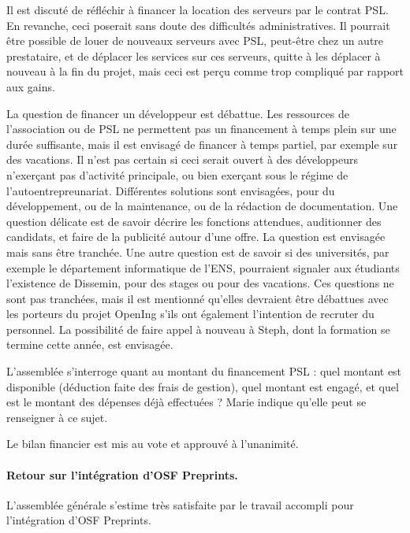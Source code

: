 \documentclass{scrartcl}
\begin{document}
Il est discuté de réfléchir à financer la location des serveurs par le contrat PSL. En revanche, ceci
poserait sans doute des difficultés administratives. Il pourrait être possible de louer de nouveaux serveurs
avec PSL, peut-être chez un autre prestataire, et de déplacer les services sur ces serveurs, quitte à
les déplacer à nouveau à la fin du projet, mais ceci est perçu comme trop compliqué par rapport aux gains.

La question de financer un développeur est débattue. Les ressources de l'association ou de PSL ne
permettent pas un financement à temps plein sur une durée suffisante, mais il est envisagé de financer
à temps partiel, par exemple sur des vacations. Il n'est pas certain si ceci serait ouvert à des développeurs
n'exerçant pas d'activité principale, ou bien exerçant sous le régime de l'autoentrepreunariat. Différentes
solutions sont envisagées, pour du développement, ou de la maintenance, ou de la rédaction de documentation. Une question délicate est de 
savoir décrire les fonctions attendues, auditionner des candidats, et faire de la publicité autour d'une offre.
La question est envisagée mais sans être tranchée. Une autre question est de savoir si des universités,
par exemple le département informatique de l'ENS, pourraient signaler aux étudiants l'existence de
Dissemin, pour des stages ou pour des vacations. Ces questions ne sont pas tranchées, mais il est mentionné
qu'elles devraient être débattues avec les porteurs du projet OpenIng s'ils ont également l'intention de recruter du
personnel. La possibilité de faire appel à nouveau à Steph, dont la formation se termine cette année, est envisagée.

L'assemblée s'interroge quant au montant du financement PSL : quel montant est disponible (déduction
faite des frais de gestion), quel montant est engagé, et quel est le montant des
dépenses déjà effectuées ?
Marie indique qu'elle peut se renseigner à ce sujet.

Le bilan financier est mis au vote et approuvé à l'unanimité.

\paragraph{Retour sur l'intégration d'OSF Preprints.}
L'assemblée générale s'estime très satisfaite par le travail accompli pour l'intégration d'OSF Preprints.
\end{document}
